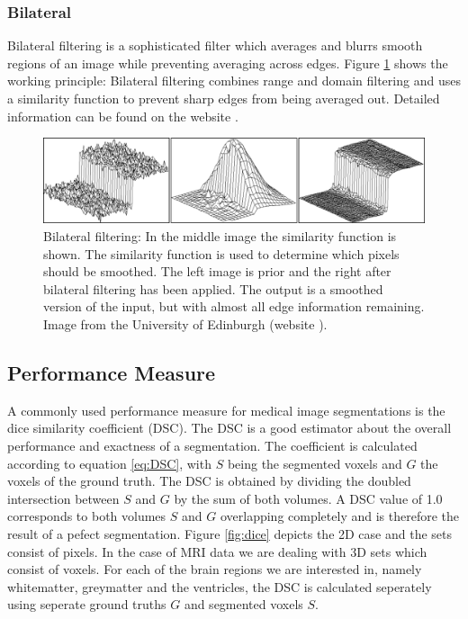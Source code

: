 \documentclass[journal]{IEEEtran}
\begin{document}
\subsubsection{Bilateral}
Bilateral filtering is a sophisticated filter which averages and blurrs smooth regions of an image while preventing averaging across edges. Figure \ref{fig:bilat} shows the working principle: Bilateral filtering combines range and domain filtering and uses a similarity function to prevent sharp edges from being averaged out. Detailed information can be found on the website \cite{bilateral}.

\begin{figure}[!t]
\centering
\includegraphics[width=\linewidth]{img/bilat}
\caption{Bilateral filtering: In the middle image the similarity function is shown. The similarity function is used to determine which pixels should be smoothed. The left image is prior and the right after bilateral filtering has been applied. The output is a smoothed version of the input, but with almost all edge information remaining. Image from the  University of Edinburgh (website \cite{bilateral}).}
\label{fig:bilat}
\end{figure}

\subsection{Performance Measure}
A commonly used performance measure for medical image segmentations is the dice similarity coefficient (DSC). The DSC is a good estimator about the overall performance and exactness of a segmentation. The coefficient is  calculated according to equation \ref{eq:DSC}, with $S$ being the segmented voxels and $G$ the voxels of the ground truth. The DSC is obtained by dividing the doubled intersection between $S$ and $G$ by the sum of both volumes. A DSC value of 1.0 corresponds to both volumes $S$ and $G$ overlapping completely and is therefore the result of a pefect segmentation. Figure \ref{fig:dice} depicts the 2D case and the sets consist of pixels. In the case of MRI data we are dealing with 3D sets which consist of voxels. For each of the brain regions we are interested in, namely whitematter, greymatter and the ventricles, the DSC is calculated seperately using seperate ground truths $G$ and segmented voxels $S$.
\end{document}
